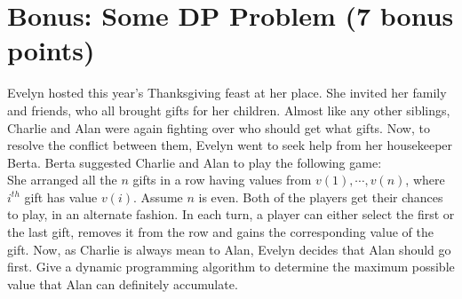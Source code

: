 \documentclass{article}
\begin{document}
\section{Bonus: Some DP Problem (7 bonus points)}
Evelyn hosted this year's Thanksgiving feast at her place. She invited her family and friends, who all brought gifts for her children. Almost like any other siblings, Charlie and Alan were again fighting over who should get what gifts. Now, to resolve the conflict between them, Evelyn went to seek help from her housekeeper Berta. Berta suggested Charlie and Alan to play the following game:\\
She arranged all the $n$ gifts in a row having values from $v(1), \cdots, v(n)$, where $i^{th}$ gift has value $v(i)$. Assume $n$ is even. Both of the players get their chances to play, in an alternate fashion. In each turn, a player can either select the first or the last gift, removes it from the row and gains the corresponding value of the gift. Now, as Charlie is always mean to Alan, Evelyn decides that Alan should go first. Give a dynamic programming algorithm to determine the maximum possible value that Alan can definitely accumulate.\\
\end{document}
